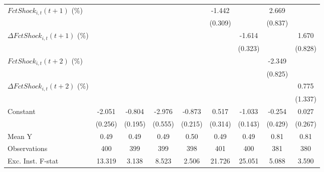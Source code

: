 {\begin{tabular}{l*{8}{c}}
\addlinespace
$ FctShock_{i,t}(t+1)$ (\%)&                     &                     &                     &                     &      -1.442\sym{***}&                     &       2.669\sym{***}&                     \\
                    &                     &                     &                     &                     &     (0.309)         &                     &     (0.837)         &                     \\
\addlinespace
$ \Delta FctShock_{i,t}(t+1)$ (\%)&                     &                     &                     &                     &                     &      -1.614\sym{***}&                     &       1.670\sym{*}  \\
                    &                     &                     &                     &                     &                     &     (0.323)         &                     &     (0.828)         \\
\addlinespace
$ FctShock_{i,t}(t+2)$ (\%)&                     &                     &                     &                     &                     &                     &      -2.349\sym{***}&                     \\
                    &                     &                     &                     &                     &                     &                     &     (0.825)         &                     \\
\addlinespace
$ \Delta FctShock_{i,t}(t+2)$ (\%)&                     &                     &                     &                     &                     &                     &                     &       0.775         \\
                    &                     &                     &                     &                     &                     &                     &                     &     (1.337)         \\
\addlinespace
Constant            &      -2.051\sym{***}&      -0.804\sym{***}&      -2.976\sym{***}&      -0.873\sym{***}&       0.517         &      -1.033\sym{***}&      -0.254         &       0.027         \\
                    &     (0.256)         &     (0.195)         &     (0.555)         &     (0.215)         &     (0.314)         &     (0.143)         &     (0.429)         &     (0.267)         \\
\midrule
Mean Y              &        0.49         &        0.49         &        0.49         &        0.50         &        0.49         &        0.49         &        0.81         &        0.81         \\
Observations        &         400         &         399         &         399         &         398         &         401         &         400         &         381         &         380         \\
Exc. Inst. F-stat   &      13.319         &       3.138         &       8.523         &       2.506         &      21.726         &      25.051         &       5.088         &       3.590         \\
\bottomrule
\end{tabular}
}
